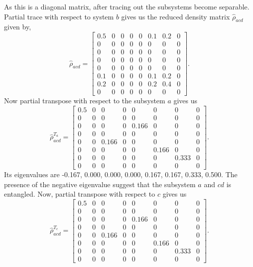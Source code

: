 \documentclass{scrartcl}
\begin{document}
As this is a diagonal matrix, after tracing out the subsystems become separable.
Partial trace with respect to system $b$ gives us the reduced density matrix $\hat{\rho}_{acd}$ given by,
\begin{equation*}
	\hat{\rho}_{acd} = \left[\begin{matrix}0.5 & 0 & 0 & 0 & 0 & 0.1 & 0.2 & 0\\0 & 0 & 0 & 0 & 0 & 0 & 0 & 0\\0 & 0 & 0 & 0 & 0 & 0 & 0 & 0\\0 & 0 & 0 & 0 & 0 & 0 & 0 & 0\\0 & 0 & 0 & 0 & 0 & 0 & 0 & 0\\0.1 & 0 & 0 & 0 & 0 & 0.1 & 0.2 & 0\\0.2 & 0 & 0 & 0 & 0 & 0.2 & 0.4 & 0\\0 & 0 & 0 & 0 & 0 & 0 & 0 & 0\end{matrix}\right].
\end{equation*}
Now partial transpose with respect to the subsystem $a$ gives us
\begin{equation*}
	\hat{\rho}_{acd}^{T_a} =\left[\begin{matrix}0.5 & 0 & 0 & 0 & 0 & 0 & 0 & 0\\0 & 0 & 0 & 0 & 0 & 0 & 0 & 0\\0 & 0 & 0 & 0 & 0.166 & 0 & 0 & 0\\0 & 0 & 0 & 0 & 0 & 0 & 0 & 0\\0 & 0 & 0.166 & 0 & 0 & 0 & 0 & 0\\0 & 0 & 0 & 0 & 0 & 0.166 & 0 & 0\\0 & 0 & 0 & 0 & 0 & 0 & 0.333 & 0\\0 & 0 & 0 & 0 & 0 & 0 & 0 & 0\end{matrix}\right].
\end{equation*}
Its eigenvalues are -0.167, 0.000, 0.000, 0.000, 0.167, 0.167, 0.333, 0.500. The presence of the negative eigenvalue suggest that the subsystem $a$ and $cd$ is entangled. Now, partial transpose with respect to $c$ gives us 
\begin{equation*}
	\hat{\rho}_{acd}^{T_c}=\left[\begin{matrix}0.5 & 0 & 0 & 0 & 0 & 0 & 0 & 0\\0 & 0 & 0 & 0 & 0 & 0 & 0 & 0\\0 & 0 & 0 & 0 & 0.166 & 0 & 0 & 0\\0 & 0 & 0 & 0 & 0 & 0 & 0 & 0\\0 & 0 & 0.166 & 0 & 0 & 0 & 0 & 0\\0 & 0 & 0 & 0 & 0 & 0.166 & 0 & 0\\0 & 0 & 0 & 0 & 0 & 0 & 0.333 & 0\\0 & 0 & 0 & 0 & 0 & 0 & 0 & 0\end{matrix}\right].
\end{equation*}
\end{document}
